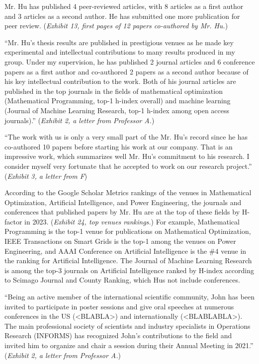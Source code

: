 \documentclass{article}
\begin{document}
Mr. Hu has published 4 peer-reviewed articles, with 8 articles as a first author and 3 articles as a second author. He has submitted one more publication for peer review. ({\it Exhibit 13, first pages of 12 papers co-authored by Mr. Hu.}) 

“Mr. Hu’s thesis results are published in prestigious venues as he made key experimental and intellectual contributions to many results produced in my group. Under my supervision, he has published 2 journal articles and 6 conference papers as a first author and co-authored 2 papers as a second author because of his key intellectual contribution to the work. Both of his journal articles are published in the top journals in the fields of mathematical optimization (Mathematical Programming, top-1 h-index overall) and machine learning (Journal of Machine Learning Research, top-1 h-index among open access journals).” ({\it Exhibit 2, a letter from Professor A.}) 

“The work with us is only a very small part of the Mr. Hu’s record since he has co-authored 10 papers before starting his work at our company. That is an impressive work, which summarizes well Mr. Hu’s commitment to his research. I consider myself very fortunate that he accepted to work on our research project.” ({\it Exhibit 3, a letter from F})

According to the Google Scholar Metrics rankings of the venues in Mathematical Optimization, Artificial Intelligence, and Power Engineering, the journals and conferences that published papers by Mr. Hu are at the top of these fields by H-factor in 2023. ({\it Exhibit 24, top venues rankings.}) For example, Mathematical Programming is the top-1 venue for publications on Mathematical Optimization, IEEE Transactions on Smart Grids is the top-1 among the venues on Power Engineering, and AAAI Conference on Artificial Intelligence is the \#4 venue in the ranking for Artificial Intelligence. The Journal of Machine Learning Research is among the top-3 journals on Artificial Intelligence ranked by H-index according to Scimago Journal and County Ranking, which Hus not include conferences.

“Being an active member of the international scientific community, John has been invited to participate in poster sessions and give oral speeches at numerous conferences in the US (<BLABLA>) and internationally (<BLABLABLA>). The main professional society of scientists and industry specialists in Operations Research (INFORMS) has recognized John’s contributions to the field and invited him to organize and chair a session during their Annual Meeting in 2021.” ({\it Exhibit 2, a letter from Professor A.}) 
\end{document}
